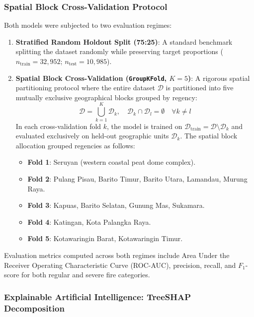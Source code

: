 \subsubsection{Spatial Block Cross-Validation Protocol}
\label{subsubsec:spatial_cv_protocol}

Both models were subjected to two evaluation regimes:
\begin{enumerate}
    \item \textbf{Stratified Random Holdout Split (75:25)}: A standard benchmark splitting the dataset randomly while preserving target proportions ($n_{\text{train}} = 32,952$; $n_{\text{test}} = 10,985$).
    \item \textbf{Spatial Block Cross-Validation (\texttt{GroupKFold}, $K=5$)}: A rigorous spatial partitioning protocol where the entire dataset $\mathcal{D}$ is partitioned into five mutually exclusive geographical blocks grouped by regency:
    \begin{equation}
    \mathcal{D} = \bigcup_{k=1}^{K} \mathcal{D}_k, \quad \mathcal{D}_k \cap \mathcal{D}_l = \emptyset \quad \forall k \ne l
    \label{eq:spatial_cv}
    \end{equation}
    In each cross-validation fold $k$, the model is trained on $\mathcal{D}_{\text{train}} = \mathcal{D} \setminus \mathcal{D}_k$ and evaluated exclusively on held-out geographic units $\mathcal{D}_k$. The spatial block allocation grouped regencies as follows:
    \begin{itemize}
        \item \textbf{Fold 1}: Seruyan (western coastal peat dome complex).
        \item \textbf{Fold 2}: Pulang Pisau, Barito Timur, Barito Utara, Lamandau, Murung Raya.
        \item \textbf{Fold 3}: Kapuas, Barito Selatan, Gunung Mas, Sukamara.
        \item \textbf{Fold 4}: Katingan, Kota Palangka Raya.
        \item \textbf{Fold 5}: Kotawaringin Barat, Kotawaringin Timur.
    \end{itemize}
\end{enumerate}

Evaluation metrics computed across both regimes include Area Under the Receiver Operating Characteristic Curve (ROC-AUC), precision, recall, and $F_1$-score for both regular and severe fire categories.

\subsubsection{Explainable Artificial Intelligence: TreeSHAP Decomposition}
\label{subsubsec:treeshap}

